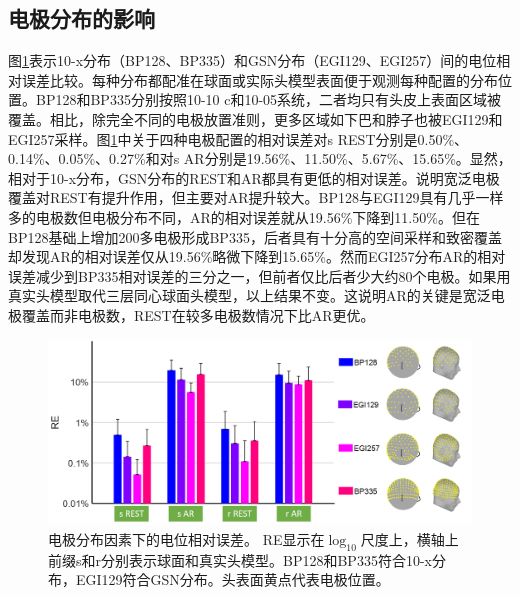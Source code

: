 \subsection{电极分布的影响}
图\ref{2:layre}表示10-x分布（BP128、BP335）和GSN分布（EGI129、EGI257）间的电位相对误差比较。每种分布都配准在球面或实际头模型表面便于观测每种配置的分布位置。BP128和BP335分别按照10-10 c和10-05系统，二者均只有头皮上表面区域被覆盖。相比，除完全不同的电极放置准则，更多区域如下巴和脖子也被EGI129和EGI257采样。图\ref{2:layre}中关于四种电极配置的相对误差对s REST分别是0.50\%、0.14\%、0.05\%、0.27\%和对s AR分别是19.56\%、11.50\%、5.67\%、15.65\%。显然，相对于10-x分布，GSN分布的REST和AR都具有更低的相对误差。说明宽泛电极覆盖对REST有提升作用，但主要对AR提升较大。BP128与EGI129具有几乎一样多的电极数但电极分布不同，AR的相对误差就从19.56\%下降到11.50\%。但在BP128基础上增加200多电极形成BP335，后者具有十分高的空间采样和致密覆盖却发现AR的相对误差仅从19.56\%略微下降到15.65\%。然而EGI257分布AR的相对误差减少到BP335相对误差的三分之一，但前者仅比后者少大约80个电极。如果用真实头模型取代三层同心球面头模型，以上结果不变。这说明AR的关键是宽泛电极覆盖而非电极数，REST在较多电极数情况下比AR更优。
\begin{figure}[!ht]
	\centering
	\includegraphics[width=\linewidth]{pic/JNE/figure5.png}
	\caption{电极分布因素下的电位相对误差。 RE显示在$\log_{10}$尺度上，横轴上前缀s和r分别表示球面和真实头模型。BP128和BP335符合10-x分布，EGI129符合GSN分布。头表面黄点代表电极位置。}
	\label{2:layre}
\end{figure}

